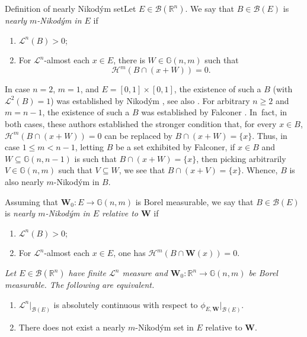 \documentclass[JEP,XML,SOM,Unicode,ThmDefs,NoEqCountersInSection]{cedram}
\newenvironment{Empty}[2][\null]{%
\begin{enonce}[remark]{#1}#2}
{\end{enonce}}
\newcommand{\R}{\mathbb{R}}
\newcommand{\Rn}{\R^n}
\newcommand{\calB}{\mathscr{B}}
\newcommand{\calH}{\mathscr{H}}
\newcommand{\calL}{\mathscr{L}}
\newcommand{\bW}{{\boldsymbol{W}}}
\newcommand{\bG}{\mathbb{G}}
\let\subset\subseteq
\begin{document}
\begin{Empty}[Definition of nearly Nikod\'ym set]
Let $E \in \calB(\Rn)$. We say that $B \in \calB(E)$ is \emph{nearly $m$-Nikod\'ym in $E$} if
\begin{enumerate}
\item $\calL^n(B) > 0$;
\item For $\calL^n$-almost each $x \in E$, there is $W \in \bG(n,m)$ such that
\[
\calH^m\left(B \cap (x+W) \right) = 0.
\]
\end{enumerate}
\par
In case $n=2$, $m=1$, and $E=[0,1] \times [0,1]$, the existence of such a $B$ (with $\calL^2(B)=1$) was established by Nikod\'ym \cite{NIK.27}, see also \cite[Chap.\,8]{GUZMAN.1981}.
For arbitrary $n \geq 2$ and $m=n-1$, the existence of such a $B$ was established by Falconer \cite{FAL.86}.
In~fact, in both cases, these authors established the stronger condition that, for every $x \in B$, $\calH^m(B \cap (x+W))=0$ can be replaced by $B \cap (x+W) = \{x\}$.
Thus, in case $1 \leq m< n-1$, letting $B$ be a set exhibited by Falconer, if $x \in B$ and $W \subset \bG(n,n-1)$ is such that $B \cap (x+W) = \{x\}$, then picking arbitrarily $V \in \bG(n,m)$ such that $V \subset W$, we see that $B \cap (x+V)=\{x\}$.
Whence, $B$ is also nearly $m$-Nikod\'ym in $B$.
\par
Assuming that $\bW_0: E \to \bG(n,m)$ is Borel measurable, we say that $B \in \calB(E)$ is \emph{nearly $m$-Nikod\'ym in $E$ relative to $\bW$} if
\begin{enumerate}
\item $\calL^n(B) > 0$;
\item For $\calL^n$-almost each $x \in E$, one has $\calH^m\left(B \cap \bW(x) \right) = 0$.
\end{enumerate}
\end{Empty}

\begin{Empty}[]
{\it
Let $E \in \calB(\Rn)$ have finite $\calL^n$ measure and $\bW_0: \Rn \to \bG(n,m)$ be Borel measurable. The following are equivalent.
\begin{enumerate}
\item\label{enum:18.1} $\calL^n |_{\calB(E)}$ is absolutely continuous with respect to $\phi_{E,\bW}|_{\calB(E)}$.
\item\label{enum:18.2} There does not exist a nearly $m$-Nikod\'ym set in $E$ relative to $\bW$.
\end{enumerate}
}
\end{Empty}
\end{document}
